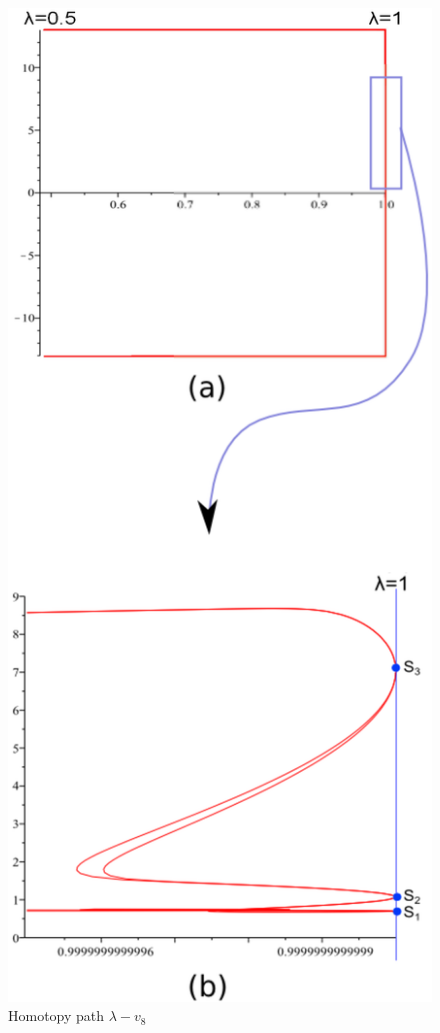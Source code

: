 \documentclass[journal,twocolumn]{IEEEtran}
\begin{document}
\begin{figure}[hbtp]
\begin{center}
	\includegraphics[scale=.4]{nh3figs/YAMAMURAV8_FULL.eps}
\end{center}
\caption{Homotopy path $\lambda-v_8$}
\label{yamaie}
\end{figure}
\end{document}
